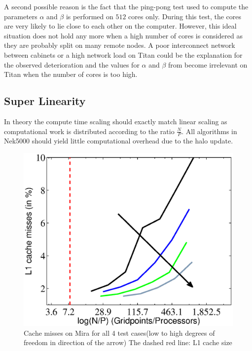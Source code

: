 \documentclass{sig-alternate}
\begin{document}
A second possible reason is the fact that the ping-pong test used to compute the parameters $\alpha$ and $\beta$ is performed on $512$ 
cores only. During this test, the cores are very likely to lie close to each other on the computer. 
However, this ideal situation does not hold any more when a high number of cores
is considered as they are probably split on many remote nodes.
A poor interconnect network between cabinets or a high network load on Titan 
could be the explanation for the observed deterioration and the values for 
$\alpha$ and $\beta$ from  become irrelevant on Titan 
when the number of cores is too high.


\subsection{Super Linearity}

In theory the compute time scaling should exactly match linear scaling
as computational work is distributed according to the ratio $\frac{N}{P}$. All
algorithms in Nek5000 should yield little computational overhead due to the halo update.

\begin{figure}
  \centering
  \includegraphics[width=\linewidth]{./figures/cachearrow.eps}
  \caption{Cache misses on Mira for all 4 test cases(low to high degrees of freedom in direction of the arrow) The dashed red line: L1 cache size}
   \label{fig:cachemisses}
\end{figure}
\end{document}
